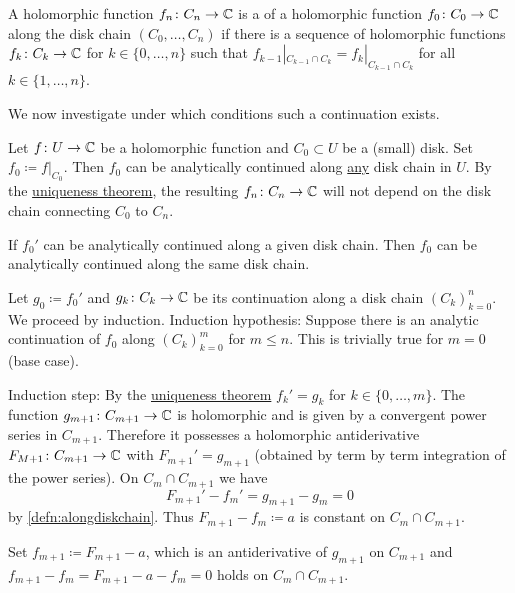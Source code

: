 \documentclass[a4paper,english]{article}
\begin{document}
\begin{defn} \label{defn:alongdiskchain}
    A holomorphic function $f_n \colon C_n \to \operatorname{\mathbb{C}}$ is a  of a holomorphic function $f_0 \colon C_0 \to \operatorname{\mathbb{C}}$ along the disk chain $(C_0, \ldots, C_n)$ if there is a sequence of holomorphic functions $f_k \colon C_k \to \operatorname{\mathbb{C}}$ for $k \in \{0, \ldots, n \}$ such that $f_{k - 1}|_{C_{k - 1} \cap C_k} = f_k |_{C_{k - 1} \cap C_k}$ for all $k \in \{1, \ldots, n\}$.
\end{defn}

We now investigate under which conditions such a continuation exists.

\begin{example}
    Let $f \colon U \to \operatorname{\mathbb{C}}$ be a holomorphic function and $C_0 \subset U$ be a (small) disk.
    Set $f_0 \coloneqq f|_{C_0}$.
    Then $f_0$ can be analytically continued along \underline{any} disk chain in $U$.
    By the \hyperref[th:unique]{uniqueness theorem}, the resulting $f_n \colon C_n \to \operatorname{\mathbb{C}}$ will not depend on the disk chain connecting $C_0$ to $C_n$.
\end{example}

\begin{lemma}
    If $f_0'$ can be analytically continued along a given disk chain.
    Then $f_0$ can be analytically continued along the same disk chain.
\end{lemma}

\begin{pr}
    Let $g_0 \coloneqq f_0'$ and $g_k \colon C_k \to \operatorname{\mathbb{C}}$ be its continuation along a disk chain $(C_k)_{k = 0}^{n}$.
    We proceed by induction.
    Induction hypothesis: Suppose there is an analytic continuation of $f_0$ along $(C_k)_{k = 0}^{m}$ for $m \le n$.
    This is trivially true for $m = 0$ (base case).
    
    Induction step:
    By the \hyperref[th:unique]{uniqueness theorem} $f_k' = g_k$ for $k \in \{ 0, \ldots, m \}$.
    The function $g_{m + 1} \colon C_{m + 1} \to \operatorname{\mathbb{C}}$ is holomorphic and is given by a convergent power series in $C_{m + 1}$.
    Therefore it possesses a holomorphic antiderivative $F_{M + 1} \colon C_{m + 1} \to \operatorname{\mathbb{C}}$ with $F_{m + 1}' = g_{m + 1}$ (obtained by term by term integration of the power series).
    On $C_{m} \cap C_{m + 1}$ we have
    \begin{equation*}
        F_{m + 1}' - f_m'
        = g_{m + 1} - g_m
        = 0
    \end{equation*}
    by \ref{defn:alongdiskchain}.
    Thus $F_{m + 1} - f_m \coloneqq a$ is constant on $C_{m} \cap C_{m + 1}$.
    
    Set $f_{m + 1} \coloneqq F_{m + 1} - a$, which is an antiderivative of $g_{m + 1}$ on $C_{m + 1}$ and $f_{m + 1} - f_m = F_{m + 1} - a - f_m = 0$ holds on $C_{m} \cap C_{m + 1}$.
\end{pr}
\end{document}
